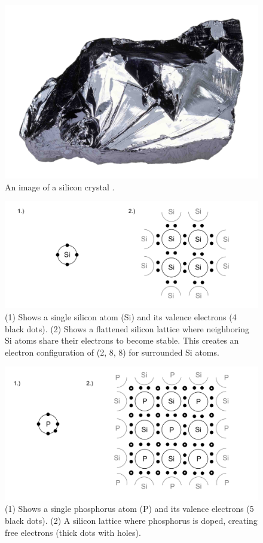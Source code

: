\begin{figure}[ht!]

  \centering
  \includegraphics[width=.6\textwidth]{Sections/circuits/sicryst.jpg}
  \caption{An image of a silicon crystal \cite{gettyimages700832601}.}
  \label{fig:atom}
\end{figure}

\vspace{2em}
\begin{figure}[ht!]

  \centering
  \includegraphics[width=\textwidth]{Sections/circuits/doping.png}
  \caption{(1) Shows a single silicon atom (Si) and its valence electrons (4 black dots).
  (2) Shows a flattened silicon lattice where neighboring Si atoms share their electrons to become stable.
  This creates an electron configuration of (2, 8, 8) for surrounded Si atoms.}
  \label{fig:doping}
\end{figure}
   
\newpage 

\noindent
\begin{figure}[ht!] 
  \centering
  \includegraphics[width=\textwidth]{Sections/circuits/n-type.png}
  \caption{(1) Shows a single phosphorus atom (P) and its valence electrons (5 black dots).
  (2) A silicon lattice where phosphorus is doped, creating free electrons (thick dots with holes). }
  \label{fig:doping2}
\end{figure}

